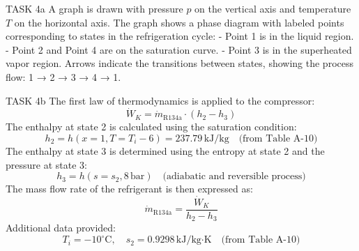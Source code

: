 TASK 4a  
A graph is drawn with pressure \( p \) on the vertical axis and temperature \( T \) on the horizontal axis. The graph shows a phase diagram with labeled points corresponding to states in the refrigeration cycle:  
- Point 1 is in the liquid region.  
- Point 2 and Point 4 are on the saturation curve.  
- Point 3 is in the superheated vapor region.  
Arrows indicate the transitions between states, showing the process flow:  
1 → 2 → 3 → 4 → 1.  

TASK 4b  
The first law of thermodynamics is applied to the compressor:  
\[
\dot{W}_K = \dot{m}_{\text{R134a}} \cdot (h_2 - h_3)
\]  
The enthalpy at state 2 is calculated using the saturation condition:  
\[
h_2 = h(x=1, T=T_i - 6) = 237.79 \, \text{kJ/kg} \quad \text{(from Table A-10)}
\]  
The enthalpy at state 3 is determined using the entropy at state 2 and the pressure at state 3:  
\[
h_3 = h(s=s_2, 8 \, \text{bar}) \quad \text{(adiabatic and reversible process)}
\]  
The mass flow rate of the refrigerant is then expressed as:  
\[
\dot{m}_{\text{R134a}} = \frac{\dot{W}_K}{h_2 - h_3}
\]  
Additional data provided:  
\[
T_i = -10^\circ\text{C}, \quad s_2 = 0.9298 \, \text{kJ/kg·K} \quad \text{(from Table A-10)}
\]